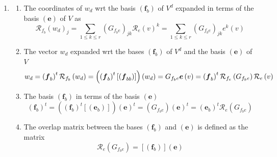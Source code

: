 \documentclass[aps,preprint]{revtex4}
\begin{document}
\begin{enumerate}
\item 
\begin{enumerate}
\item The coordinates of $w_{d}$ wrt the basis $\left( \boldsymbol{f}%
_{b}\right) $ of $V^{d}$ expanded in terms of the basis $\left( \boldsymbol{e%
}\right) $ of $V$ as%
\begin{equation}
\mathcal{R}_{f_{b}}\left( w_{d}\right) _{j}=\sum_{1\leq k\leq r}\left(
G_{f_{b}e}\right) _{jk}\mathcal{R}_{e}\left( v\right) ^{k}=\sum_{1\leq k\leq
r}\left( G_{f_{b}e}\right) _{jk}e^{k}\left( v\right)
\end{equation}

\item The vector $w_{d}$ expanded wrt the bases $\left( \boldsymbol{f}%
_{b}\right) $ of $V^{d}$ and the basis $\left( \boldsymbol{e}\right) $ of $V$%
\begin{equation}
w_{d}=\left( \boldsymbol{f}_{b}\right) ^{t}\mathcal{R}_{f_{b}}\left(
w_{d}\right) =\left( \left( \boldsymbol{f}_{b}\right) ^{t}\left[ \left( 
\boldsymbol{f}_{bb}\right) \right] \right) \left( w_{d}\right) =G_{f_{b}e}%
\boldsymbol{e}\left( v\right) =\left( \boldsymbol{f}_{b}\right) ^{t}\mathcal{%
R}_{f_{e}}\left( G_{f_{b}e}\right) \mathcal{R}_{e}\left( v\right)
\end{equation}

\item The basis $\left( \boldsymbol{f}_{b}\right) $ in terms of the basis $%
\left( \boldsymbol{e}\right) $ 
\begin{equation}
\left( \boldsymbol{f}_{b}\right) ^{t}=\left( \left( \boldsymbol{f}%
_{b}\right) ^{t}\left[ \left( \boldsymbol{e}_{b}\right) \right] \right)
\left( \boldsymbol{e}\right) ^{t}=\left( G_{f_{b}e}\right) \left( 
\boldsymbol{e}\right) ^{t}=\left( \boldsymbol{e}_{b}\right) ^{t}\mathcal{R}%
_{e}\left( G_{f_{b}e}\right)
\end{equation}

\item The overlap matrix between the bases $\left( \boldsymbol{f}_{b}\right) 
$ and $\left( \boldsymbol{e}\right) $ is defined as the matrix 
\begin{equation}
\mathcal{R}_{e}\left( G_{f_{b}e}\right) =\left[ \left( \boldsymbol{f}%
_{b}\right) \right] \left( \boldsymbol{e}\right)
\end{equation}


\end{enumerate}
\end{enumerate}
\end{document}
